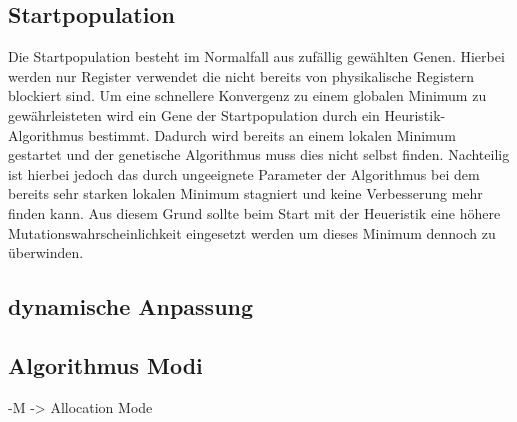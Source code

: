 \subsection{Startpopulation}
Die Startpopulation besteht im Normalfall aus zufällig gewählten Genen. Hierbei werden nur Register verwendet die nicht bereits von physikalische Registern blockiert sind.
Um eine schnellere Konvergenz zu einem globalen Minimum zu gewährleisteten wird ein Gene der Startpopulation durch ein Heuristik-Algorithmus bestimmt. Dadurch wird bereits an einem lokalen Minimum gestartet und der genetische Algorithmus muss dies nicht selbst finden. 
Nachteilig ist hierbei jedoch das durch ungeeignete Parameter der Algorithmus bei dem bereits sehr starken lokalen Minimum stagniert und keine Verbesserung mehr finden kann. Aus diesem Grund sollte beim Start mit der Heueristik eine höhere Mutationswahrscheinlichkeit eingesetzt werden um dieses Minimum dennoch zu überwinden.

\subsection{dynamische Anpassung}
\newpage
\subsection{Algorithmus Modi}

-M -> Allocation Mode

